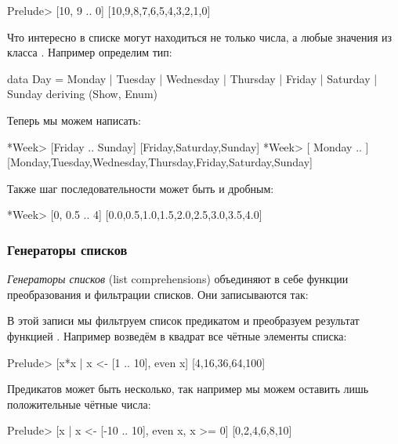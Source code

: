 \begin{code}
Prelude> [10, 9 .. 0]
[10,9,8,7,6,5,4,3,2,1,0]
\end{code}

Что интересно в списке могут находиться не только числа,
а любые значения из класса . Например определим
тип:

\begin{code}
data Day    = Monday | Tuesday | Wednesday | Thursday
            | Friday | Saturday | Sunday
            deriving (Show, Enum)
\end{code}

Теперь мы можем написать: 

\begin{code}
*Week> [Friday .. Sunday]
[Friday,Saturday,Sunday]
*Week> [ Monday .. ]
[Monday,Tuesday,Wednesday,Thursday,Friday,Saturday,Sunday]
\end{code}

Также шаг последовательности может быть и дробным:

\begin{code}
*Week> [0, 0.5 .. 4]
[0.0,0.5,1.0,1.5,2.0,2.5,3.0,3.5,4.0]
\end{code}

\subsubsection{Генераторы списков}

\emph{Генераторы списков} (list comprehensions) объединяют в себе
функции преобразования и фильтрации списков. Они записываются
так:

\begin{code}
[ f x | x <- list, p x]
\end{code}

В этой записи мы фильтруем список  предикатом 
и преобразуем результат функцией . Например возведём
в квадрат все чётные элементы списка:

\begin{code}
Prelude> [x*x | x <- [1 .. 10], even x]
[4,16,36,64,100]
\end{code}

Предикатов может быть несколько, так например мы можем
оставить лишь положительные чётные числа:

\begin{code}
Prelude> [x | x <- [-10 .. 10], even x, x >= 0]
[0,2,4,6,8,10]
\end{code}

